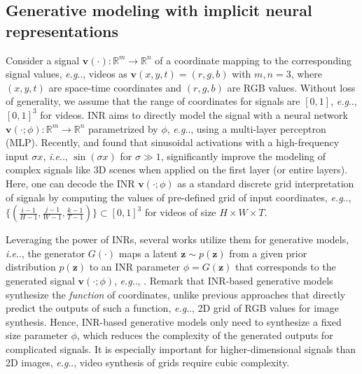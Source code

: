 \documentclass{article} \usepackage{iclr2022_conference,times}
\makeatletter
\DeclareRobustCommand\onedot{\futurelet\@let@token\@onedot}
\def\@onedot{\ifx\@let@token.\else.\null\fi\xspace}
\def\eg{\emph{e.g}\onedot} \def\Eg{\emph{E.g}\onedot}
\def\ie{\emph{i.e}\onedot} \def\Ie{\emph{I.e}\onedot}
\makeatother
\begin{document}
 

\subsection{Generative modeling with implicit neural representations}
\label{subsec:method-inr}

Consider a signal $\mathbf{v}(\cdot): \mathbb{R}^{m} \rightarrow \mathbb{R}^{n}$ of a coordinate mapping to the corresponding signal values, \eg, videos as $\mathbf{v}(x,y,t) = (r,g,b)$ with $m,n=3$, where $(x,y,t)$ are space-time coordinates and $(r,g,b)$ are RGB values. Without loss of generality, we assume that the range of coordinates for signals are $[0,1]$, \eg, $[0,1]^3$ for videos. INR aims to directly model the signal with a neural network $\mathbf{v}(\cdot;\phi): \mathbb{R}^{m} \rightarrow \mathbb{R}^{n}$ parametrized by $\phi$, \eg, using a multi-layer perceptron (MLP). Recently, \citet{tancik2020fourier} and \citet{sitzmann2020implicit} found that sinusoidal activations with a high-frequency input $\sigma x$, \ie, $\sin (\sigma x)$ for $\sigma \gg 1$, significantly improve the modeling of complex signals like 3D scenes \citep{mildenhall2020nerf}
when applied on the first layer (or entire layers). Here, one can decode the INR $\mathbf{v}(\cdot;\phi)$ as a standard discrete grid interpretation of signals by computing the values of pre-defined grid of input coordinates, \eg, $\{(\frac{i-1}{H-1}, \frac{j-1}{W-1}, \frac{k-1}{T-1})\} \subset [0,1]^3$ for videos of size $H \times W \times T$.

Leveraging the power of INRs, several works utilize them for generative models, \ie, the generator $G(\cdot)$ maps a latent $\bm{z} \sim p(\bm{z})$ from a given prior distribution $p(\bm{z})$ to an INR parameter $\phi = G(\bm{z})$ that corresponds to the generated signal $\mathbf{v}(\cdot;\phi)$, \eg, \citet{chan2021pi}. Remark that INR-based generative models synthesize the \emph{function} of coordinates, unlike previous approaches that directly predict the outputs of such a function, \eg, 2D grid of RGB values for image synthesis. Hence, INR-based generative models only need to synthesize a fixed size parameter $\phi$, which reduces the complexity of the generated outputs for complicated signals. It is especially important for higher-dimensional signals than 2D images, \eg, video synthesis of grids require cubic complexity.
\end{document}
